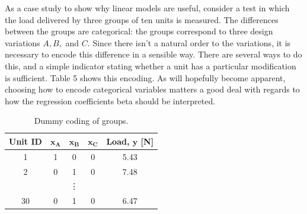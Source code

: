 \documentclass[11pt,a4paper,article]{memoir} %
\begin{document}
As a case study to show why linear models are useful, consider a test in which the load delivered by three groups of ten units is measured. The differences between the groups are categorical: the groups correspond to three design variations $A, B,$ and $C$. Since there isn't a natural order to the variations, it is necessary to encode this difference in a sensible way. There are several ways to do this, and a simple indicator stating whether a unit has a particular modification is sufficient. Table 5 shows this encoding. As will hopefully become apparent, choosing how to encode categorical variables matters a good deal with regards to how the regression coefficients beta should be interpreted.
\begin{table}
\centering
\caption{Dummy coding of groups.}
\small
\begin{tabular}{c c c c c}
\toprule
\textbf{Unit ID}                 & $\mathbf{x_A}$ & $\mathbf{x_B}$ & $\mathbf{x_C}$ & \textbf{Load, $\mathbf{y}$ [N]} \\
\midrule
1                       & 1 & 0 & 0 & 5.43         \\
2                       & 0 & 1 & 0 & 7.48         \\ 
& & \vdots & & \\
30 & 0 & 1 & 0 & 6.47 \\
\bottomrule
\end{tabular}
\end{table}
\end{document}
